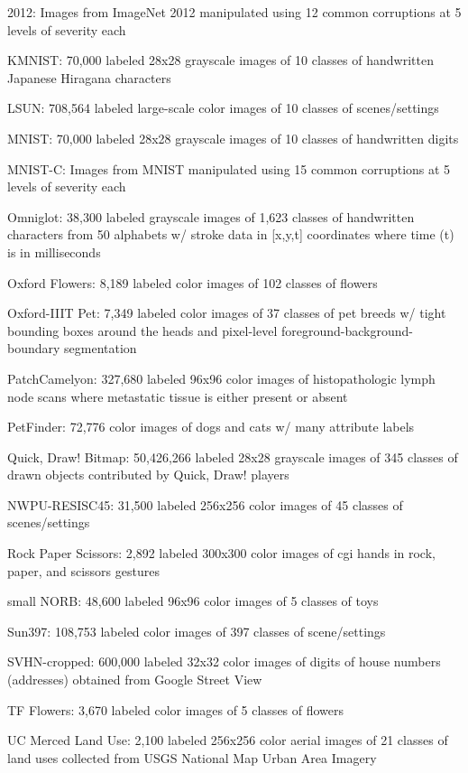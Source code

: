 \documentclass{tufte-handout}
\begin{document}
  2012: Images from ImageNet 2012 manipulated using 12 common
  corruptions at 5 levels of severity each
\item
 KMNIST:
  70,000 labeled 28x28 grayscale images of 10 classes of handwritten
  Japanese Hiragana characters
\item
  LSUN:
  708,564 labeled large-scale color images of 10 classes of
  scenes/settings
\item
 MNIST:
  70,000 labeled 28x28 grayscale images of 10 classes of handwritten
  digits
\item
 MNIST-C:
  Images from MNIST manipulated using 15 common corruptions at 5 levels
  of severity each
\item
  Omniglot:
  38,300 labeled grayscale images of 1,623 classes of handwritten
  characters from 50 alphabets w/ stroke data in {[}x,y,t{]} coordinates
  where time (t) is in milliseconds
\item
 Oxford
  Flowers: 8,189 labeled color images of 102 classes of flowers
\item
  Oxford-IIIT
  Pet: 7,349 labeled color images of 37 classes of pet breeds w/ tight
  bounding boxes around the heads and pixel-level
  foreground-background-boundary segmentation
\item
  PatchCamelyon:
  327,680 labeled 96x96 color images of histopathologic lymph node scans
  where metastatic tissue is either present or absent
\item
PetFinder:
  72,776 color images of dogs and cats w/ many attribute labels
\item
  Quick,
  Draw! Bitmap: 50,426,266 labeled 28x28 grayscale images of 345
  classes of drawn objects contributed by Quick, Draw! players
\item
NWPU-RESISC45:
  31,500 labeled 256x256 color images of 45 classes of scenes/settings
\item
  Rock
  Paper Scissors: 2,892 labeled 300x300 color images of cgi hands in
  rock, paper, and scissors gestures
\item
small
  NORB: 48,600 labeled 96x96 color images of 5 classes of toys
\item
 Sun397:
  108,753 labeled color images of 397 classes of scene/settings
\item
 SVHN-cropped:
  600,000 labeled 32x32 color images of digits of house numbers
  (addresses) obtained from Google Street View
\item
TF
  Flowers: 3,670 labeled color images of 5 classes of flowers
\item
 UC
  Merced Land Use: 2,100 labeled 256x256 color aerial images of 21
  classes of land uses collected from USGS National Map Urban Area
  Imagery
\ei
\end{document}
